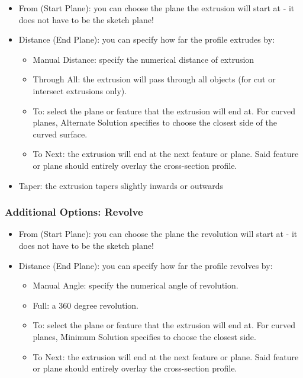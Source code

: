 \begin{itemize}
    \item From (Start Plane): you can choose the plane the extrusion will start at - it does not have to be the sketch plane!
    \item Distance (End Plane): you can specify how far the profile extrudes by:
    
    \begin{itemize}
        \item Manual Distance: specify the numerical distance of extrusion
        \item Through All: the extrusion will pass through all objects (for cut or intersect extrusions only).
        \item To: select the plane or feature that the extrusion will end at. For curved planes, Alternate Solution specifies to choose the closest side of the curved surface.
        \item To Next: the extrusion will end at the next feature or plane. Said feature or plane should entirely overlay the cross-section profile.
    \end{itemize}

    \item Taper: the extrusion tapers slightly inwards or outwards

\end{itemize}

\subsubsection{Additional Options: Revolve}

\begin{itemize}
    \item From (Start Plane): you can choose the plane the revolution will start at - it does not have to be the sketch plane!
    \item Distance (End Plane): you can specify how far the profile revolves by:
    
    \begin{itemize}
        \item Manual Angle: specify the numerical angle of revolution.
        \item Full: a 360 degree revolution.
        \item To: select the plane or feature that the extrusion will end at. For curved planes, Minimum Solution specifies to choose the closest side.
        \item To Next: the extrusion will end at the next feature or plane. Said feature or plane should entirely overlay the cross-section profile.
    \end{itemize}

\end{itemize}

